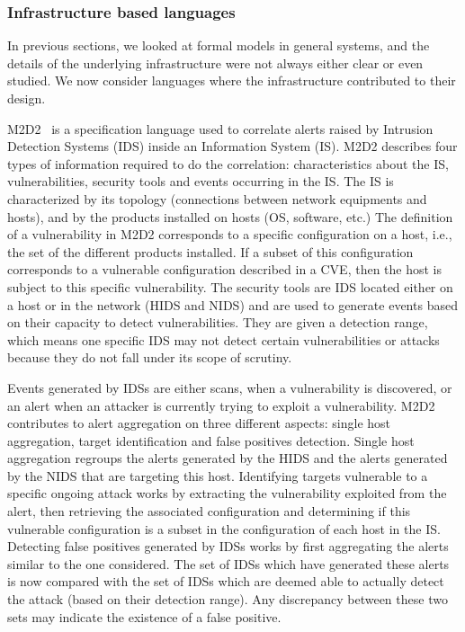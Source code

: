 \subsubsection{Infrastructure based languages}
In previous sections, we looked at formal models in general systems, and the details of the underlying infrastructure were not always either clear or even studied. We now consider languages where the infrastructure contributed to their design.

M2D2~\cite{M2D2-Morin2002} is a specification language used to correlate alerts raised by Intrusion Detection Systems (IDS) inside an Information System (IS).
M2D2 describes four types of information required to do the correlation: characteristics about the IS, vulnerabilities, security tools and events occurring in the IS.
The IS is characterized by its topology (connections between network equipments and hosts), and by the products installed on hosts (\eg OS, software,  etc.)
The definition of a vulnerability in M2D2 corresponds to a specific configuration on a host, i.e., the set of the different products installed.
If a subset of this configuration corresponds to a vulnerable configuration described in a CVE, then the host is subject to this specific vulnerability.
The security tools are IDS located either on a host or in the network (HIDS and NIDS) and are used to generate events based on their capacity to detect vulnerabilities.
They are given a detection range, which means one specific IDS may not detect certain vulnerabilities or attacks because they do not fall under its scope of scrutiny. 

Events generated by IDSs are either scans, when a vulnerability is discovered, or an alert when an attacker is currently trying to exploit a vulnerability.
M2D2 contributes to alert aggregation on three different aspects: single host aggregation, target identification and false positives detection.
Single host aggregation regroups the alerts generated by the HIDS and the alerts generated by the NIDS that are targeting this host.
Identifying targets vulnerable to a specific ongoing attack works by extracting the vulnerability exploited from the alert, then retrieving the associated configuration and determining if this vulnerable configuration is a subset in the configuration of each host in the IS.
Detecting false positives generated by IDSs works by first aggregating the alerts similar to the one considered.
The set of IDSs which have generated these alerts is now compared with the set of IDSs which are deemed able to actually detect the attack (based on their detection range).
Any discrepancy between these two sets may indicate the existence of a false positive.


